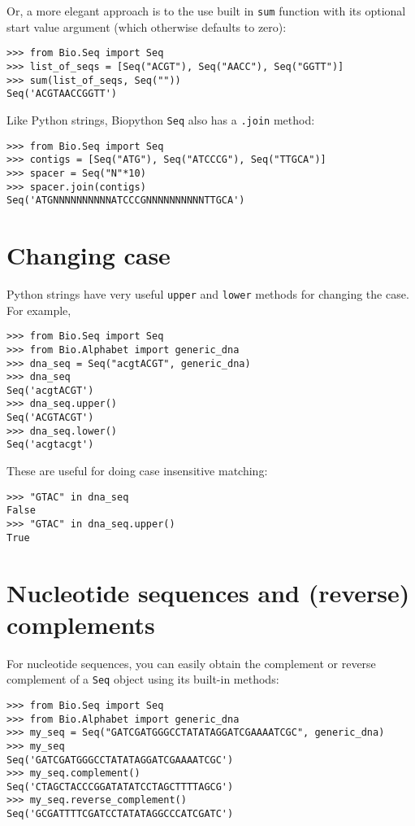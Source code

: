 Or, a more elegant approach is to the use built in \verb|sum| function with its optional start value argument (which otherwise defaults to zero):

\begin{verbatim}
>>> from Bio.Seq import Seq
>>> list_of_seqs = [Seq("ACGT"), Seq("AACC"), Seq("GGTT")]
>>> sum(list_of_seqs, Seq(""))
Seq('ACGTAACCGGTT')
\end{verbatim}

Like Python strings, Biopython \verb|Seq| also has a \verb|.join| method:

\begin{verbatim}
>>> from Bio.Seq import Seq
>>> contigs = [Seq("ATG"), Seq("ATCCCG"), Seq("TTGCA")]
>>> spacer = Seq("N"*10)
>>> spacer.join(contigs)
Seq('ATGNNNNNNNNNNATCCCGNNNNNNNNNNTTGCA')
\end{verbatim}

\section{Changing case}

Python strings have very useful \verb|upper| and \verb|lower| methods for changing the case.
For example,

\begin{verbatim}
>>> from Bio.Seq import Seq
>>> from Bio.Alphabet import generic_dna
>>> dna_seq = Seq("acgtACGT", generic_dna)
>>> dna_seq
Seq('acgtACGT')
>>> dna_seq.upper()
Seq('ACGTACGT')
>>> dna_seq.lower()
Seq('acgtacgt')
\end{verbatim}

These are useful for doing case insensitive matching:

\begin{verbatim}
>>> "GTAC" in dna_seq
False
>>> "GTAC" in dna_seq.upper()
True
\end{verbatim}

\section{Nucleotide sequences and (reverse) complements}
\label{sec:seq-reverse-complement}

For nucleotide sequences, you can easily obtain the complement or reverse
complement of a \verb|Seq| object using its built-in methods:

\begin{verbatim}
>>> from Bio.Seq import Seq
>>> from Bio.Alphabet import generic_dna
>>> my_seq = Seq("GATCGATGGGCCTATATAGGATCGAAAATCGC", generic_dna)
>>> my_seq
Seq('GATCGATGGGCCTATATAGGATCGAAAATCGC')
>>> my_seq.complement()
Seq('CTAGCTACCCGGATATATCCTAGCTTTTAGCG')
>>> my_seq.reverse_complement()
Seq('GCGATTTTCGATCCTATATAGGCCCATCGATC')
\end{verbatim}

